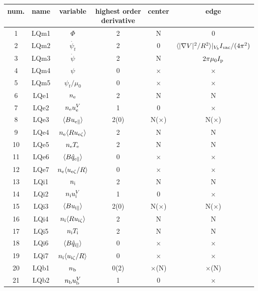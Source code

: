 \documentclass[11pt]{article}
\def\r#1{{\rm#1}}
\def\aves#1{\langle#1\rangle}
\def\para{\parallel}
\def\psid{\dot{\psi}}
\def\psit{\psi_t}
\def\psitd{\dot{\psit}}
\def\nee{n_\r{e}}
\def\ni{n_\r{i}}
\def\nb{n_\r{b}}
\def\Te{T_\r{e}}
\def\Ti{T_\r{i}}
\def\uezt{u_{\r{e}\zeta}}
\def\uizt{u_{\r{i}\zeta}}
\def\uepara{u_{\r{e}\para}}
\def\uipara{u_{\r{i}\para}}
\def\qhatepara{\hat{q}_{\r{e}\para}}
\def\qhatipara{\hat{q}_{\r{i}\para}}
\def\ueV{u_\r{e}^V}
\def\uiV{u_\r{i}^V}
\def\ubV{u_\r{b}^V}
\begin{document}
%
\begin{tabular}{|c|c|c|c|c|c|}\hline
 num. & name & variable             & \shortstack{highest order\\ derivative} & center & edge \\\hline
 1    & LQm1 & $\Phi$               & 2    &  N           & 0\\
 2    & LQm2 & $\psitd$             & 2    &  0           & $\aves{|\nabla V|^2/R^2}|_{V_b}I_\r{vac}/(4\pi^2)$\\
 3    & LQm3 & $\psid$              & 2    &  N           & $2\pi\mu_0I_\r{p}$\\
 4    & LQm4 & $\psi$               & 0    &  $\times$    & $\times$\\
 5    & LQm5 & $\psit/\mu_0$        & 0    &  $\times$    & $\times$\\
 6    & LQe1 & $\nee$               & 2    &  N           & N\\
 7    & LQe2 & $\nee\ueV$           & 1    &  0           & $\times$\\
 8    & LQe3 & $\aves{B\uepara}$    & 2(0) &  N($\times$) & N($\times$)\\
 9    & LQe4 & $\nee\aves{R\uezt}$  & 2    &  N           & N\\
 10   & LQe5 & $\nee \Te$           & 2    &  N           & N\\
 11   & LQe6 & $\aves{B\qhatepara}$ & 0    &  $\times$    & $\times$\\
 12   & LQe7 & $\nee\aves{\uezt/R}$ & 0    &  $\times$    & $\times$\\
 13   & LQi1 & $\ni$                & 2    &  N           & N\\
 14   & LQi2 & $\ni\uiV$            & 1    &  0           & $\times$\\
 15   & LQi3 & $\aves{B\uipara}$    & 2(0) &  N($\times$) & N($\times$)\\
 16   & LQi4 & $\ni\aves{R\uizt}$   & 2    &  N           & N\\
 17   & LQi5 & $\ni \Ti$            & 2    &  N           & N\\
 18   & LQi6 & $\aves{B\qhatipara}$ & 0    &  $\times$    & $\times$\\
 19   & LQi7 & $\ni\aves{\uizt/R}$  & 0    &  $\times$    & $\times$\\
 20   & LQb1 & $\nb$                & 0(2) &  $\times$(N) & $\times$(N)\\
 21   & LQb2 & $\nb\ubV$            & 1    &  0           & $\times$\\

\end{tabular}
\end{document}
